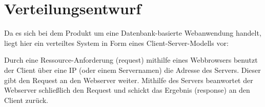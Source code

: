 \chapter{Verteilungsentwurf}
Da es sich bei dem Produkt um eine Datenbank-basierte Webanwendung handelt, liegt hier ein verteiltes System in Form eines Client-Server-Modells vor:

Durch eine Ressource-Anforderung (request) mithilfe eines Webbrowsers benutzt der Client über eine IP (oder einem Servernamen) die Adresse des Servers. Dieser gibt den Request an den Webserver weiter.
Mithilfe des Servers beanwortet der Webserver schließlich den Request und schickt das Ergebnis (response) an den Client zurück.   

